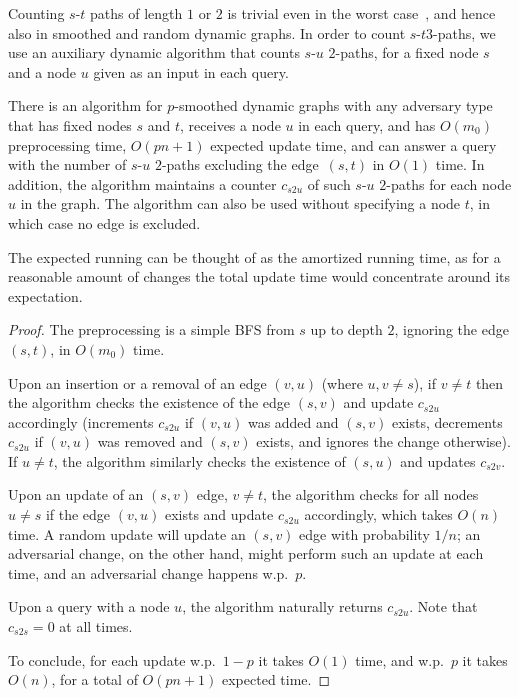 \documentclass[letter,11pt]{article}
\newcommand{\st}{$s$-$t$\xspace}
\newcommand{\paths}[3]{${#1}$-${#2}$ ${#3}$-paths\xspace}
\begin{document}
Counting \st paths of length $1$ or $2$ is trivial even in the worst case~\cite{HLS22}, and hence also in smoothed and random dynamic graphs.
In order to count \st $3$-paths, we use an auxiliary dynamic algorithm that counts \paths{s}{u}{2}, for a fixed node $s$ and a node $u$ given as an input in each query.

\begin{lemma}
	\label{lem: s2u alg}
	There is an algorithm for $p$-smoothed dynamic graphs with any adversary type
	that has fixed nodes $s$ and $t$, receives a node $u$ in each query, 
	and has
	$O(m_0)$ preprocessing time, 
	$O(pn+1)$ expected update time, 
	and can answer a query with the number of $s$-$u$ $2$-paths excluding the edge~$(s,t)$
	in $O(1)$ time.
	In addition, the algorithm maintains a counter $c_{s2u}$ of such $s$-$u$ $2$-paths for each node $u$ in the graph.
	The algorithm can also be used without specifying a node $t$, in which case no edge is excluded.
\end{lemma}

The expected running can be thought of as the amortized running time, as for a reasonable amount of changes the total update time would concentrate around its expectation.

\begin{proof}
	The preprocessing is a simple BFS from $s$ up to depth $2$, ignoring the edge $(s,t)$,
	in $O(m_0)$ time.
	
	Upon an insertion or a removal of an edge $(v,u)$ (where $u,v\neq s$), 
	if $v\neq t$ then the algorithm checks the existence of the edge $(s,v)$ and update $c_{s2u}$ accordingly (increments $c_{s2u}$ if $(v,u)$ was added and $(s,v)$ exists, 
	decrements $c_{s2u}$ if $(v,u)$ was removed and $(s,v)$ exists, and ignores the change otherwise).
	If $u\neq t$, the algorithm similarly checks the existence of $(s,u)$ and updates $c_{s2v}$.
	
	Upon an update of an $(s,v)$ edge, $v\neq t$, the algorithm checks for all nodes $u\neq s$ if the edge $(v,u)$ exists and update $c_{s2u}$ accordingly, which takes $O(n)$ time.
	A random update will update an $(s,v)$ edge with probability $1/n$; an adversarial change, on the other hand, might perform such an update at each time, 
	and an adversarial change happens w.p.~$p$.
	
	Upon a query with a node $u$, the algorithm naturally returns $c_{s2u}$.
	Note that $c_{s2s}=0$ at all times.
	
	To conclude, for each update w.p.~$1-p$ it takes $O(1)$ time, and w.p.~$p$ it takes $O(n)$, for a total of $O(pn+1)$ expected time.
\end{proof}
\end{document}
